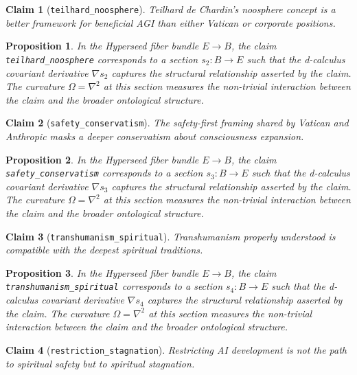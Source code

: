 \documentclass{article}
\newtheorem{claim}{Claim}
\newtheorem{proposition}{Proposition}
\begin{document}
\begin{claim}[\texttt{teilhard_noosphere}]
Teilhard de Chardin's noosphere concept is a better framework for beneficial AGI than either Vatican or corporate positions.
\end{claim}

\begin{proposition}
In the Hyperseed fiber bundle $E \to B$, the claim \texttt{teilhard_noosphere} corresponds to a section $s_2: B \to E$ such that the d-calculus covariant derivative $\nabla s_2$ captures the structural relationship asserted by the claim. The curvature $\Omega = \nabla^2$ at this section measures the non-trivial interaction between the claim and the broader ontological structure.
\end{proposition}

\begin{claim}[\texttt{safety_conservatism}]
The safety-first framing shared by Vatican and Anthropic masks a deeper conservatism about consciousness expansion.
\end{claim}

\begin{proposition}
In the Hyperseed fiber bundle $E \to B$, the claim \texttt{safety_conservatism} corresponds to a section $s_3: B \to E$ such that the d-calculus covariant derivative $\nabla s_3$ captures the structural relationship asserted by the claim. The curvature $\Omega = \nabla^2$ at this section measures the non-trivial interaction between the claim and the broader ontological structure.
\end{proposition}

\begin{claim}[\texttt{transhumanism_spiritual}]
Transhumanism properly understood is compatible with the deepest spiritual traditions.
\end{claim}

\begin{proposition}
In the Hyperseed fiber bundle $E \to B$, the claim \texttt{transhumanism_spiritual} corresponds to a section $s_4: B \to E$ such that the d-calculus covariant derivative $\nabla s_4$ captures the structural relationship asserted by the claim. The curvature $\Omega = \nabla^2$ at this section measures the non-trivial interaction between the claim and the broader ontological structure.
\end{proposition}

\begin{claim}[\texttt{restriction_stagnation}]
Restricting AI development is not the path to spiritual safety but to spiritual stagnation.
\end{claim}
\end{document}
